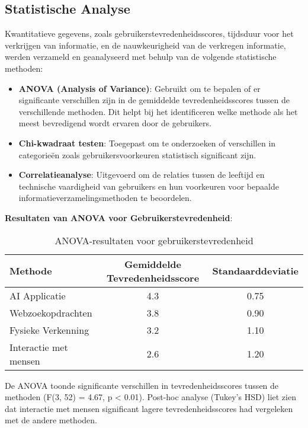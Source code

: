 \subsection{Statistische Analyse}
Kwantitatieve gegevens, zoals gebruikerstevredenheidsscores, tijdsduur voor het verkrijgen van informatie, en de nauwkeurigheid van de verkregen informatie, werden verzameld en geanalyseerd met behulp van de volgende statistische methoden:
\begin{itemize}
    \item \textbf{ANOVA (Analysis of Variance)}: Gebruikt om te bepalen of er significante verschillen zijn in de gemiddelde tevredenheidsscores tussen de verschillende methoden. Dit helpt bij het identificeren welke methode als het meest bevredigend wordt ervaren door de gebruikers.
    \item \textbf{Chi-kwadraat testen}: Toegepast om te onderzoeken of verschillen in categorieën zoals gebruikersvoorkeuren statistisch significant zijn.
    \item \textbf{Correlatieanalyse}: Uitgevoerd om de relaties tussen de leeftijd en technische vaardigheid van gebruikers en hun voorkeuren voor bepaalde informatieverzamelingsmethoden te beoordelen.
\end{itemize}

\textbf{Resultaten van ANOVA voor Gebruikerstevredenheid}:
\begin{table}[H]
    \centering
    \begin{tabular}{|l|c|c|}
        \hline
        \textbf{Methode}           & \textbf{Gemiddelde Tevredenheidsscore} & \textbf{Standaarddeviatie} \\ \hline
        AI Applicatie              & 4.3                                   & 0.75                      \\ \hline
        Webzoekopdrachten           & 3.8                                   & 0.90                      \\ \hline
        Fysieke Verkenning          & 3.2                                   & 1.10                      \\ \hline
        Interactie met mensen       & 2.6                                   & 1.20                      \\ \hline
    \end{tabular}
    \caption{ANOVA-resultaten voor gebruikerstevredenheid}
    \label{tab:anova-satisfaction}
\end{table}

De ANOVA toonde significante verschillen in tevredenheidsscores tussen de methoden (F(3, 52) = 4.67, p < 0.01). Post-hoc analyse (Tukey's HSD) liet zien dat interactie met mensen significant lagere tevredenheidsscores had vergeleken met de andere methoden.

